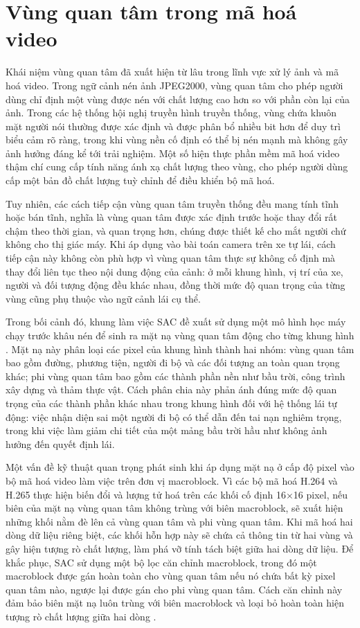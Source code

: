 \section{Vùng quan tâm trong mã hoá video}

Khái niệm vùng quan tâm đã xuất hiện từ lâu trong lĩnh vực xử lý ảnh và mã hoá video. Trong ngữ cảnh nén ảnh JPEG2000, vùng quan tâm cho phép người dùng chỉ định một vùng được nén với chất lượng cao hơn so với phần còn lại của ảnh. Trong các hệ thống hội nghị truyền hình truyền thống, vùng chứa khuôn mặt người nói thường được xác định và được phân bổ nhiều bit hơn để duy trì biểu cảm rõ ràng, trong khi vùng nền cố định có thể bị nén mạnh mà không gây ảnh hưởng đáng kể tới trải nghiệm. Một số hiện thực phần mềm mã hoá video thậm chí cung cấp tính năng ánh xạ chất lượng theo vùng, cho phép người dùng cấp một bản đồ chất lượng tuỳ chỉnh để điều khiển bộ mã hoá.

Tuy nhiên, các cách tiếp cận vùng quan tâm truyền thống đều mang tính tĩnh hoặc bán tĩnh, nghĩa là vùng quan tâm được xác định trước hoặc thay đổi rất chậm theo thời gian, và quan trọng hơn, chúng được thiết kế cho mắt người chứ không cho thị giác máy. Khi áp dụng vào bài toán camera trên xe tự lái, cách tiếp cận này không còn phù hợp vì vùng quan tâm thực sự không cố định mà thay đổi liên tục theo nội dung động của cảnh: ở mỗi khung hình, vị trí của xe, người và đối tượng động đều khác nhau, đồng thời mức độ quan trọng của từng vùng cũng phụ thuộc vào ngữ cảnh lái cụ thể.

Trong bối cảnh đó, khung làm việc SAC đề xuất sử dụng một mô hình học máy chạy trước khâu nén để sinh ra mặt nạ vùng quan tâm động cho từng khung hình \cite{SAC}. Mặt nạ này phân loại các pixel của khung hình thành hai nhóm: vùng quan tâm bao gồm đường, phương tiện, người đi bộ và các đối tượng an toàn quan trọng khác; phi vùng quan tâm bao gồm các thành phần nền như bầu trời, công trình xây dựng và thảm thực vật. Cách phân chia này phản ánh đúng mức độ quan trọng của các thành phần khác nhau trong khung hình đối với hệ thống lái tự động: việc nhận diện sai một người đi bộ có thể dẫn đến tai nạn nghiêm trọng, trong khi việc làm giảm chi tiết của một mảng bầu trời hầu như không ảnh hưởng đến quyết định lái.

Một vấn đề kỹ thuật quan trọng phát sinh khi áp dụng mặt nạ ở cấp độ pixel vào bộ mã hoá video làm việc trên đơn vị macroblock. Vì các bộ mã hoá H.264 và H.265 thực hiện biến đổi và lượng tử hoá trên các khối cố định 16$\times$16 pixel, nếu biên của mặt nạ vùng quan tâm không trùng với biên macroblock, sẽ xuất hiện những khối nằm đè lên cả vùng quan tâm và phi vùng quan tâm. Khi mã hoá hai dòng dữ liệu riêng biệt, các khối hỗn hợp này sẽ chứa cả thông tin từ hai vùng và gây hiện tượng rò chất lượng, làm phá vỡ tính tách biệt giữa hai dòng dữ liệu. Để khắc phục, SAC sử dụng một bộ lọc căn chỉnh macroblock, trong đó một macroblock được gán hoàn toàn cho vùng quan tâm nếu nó chứa bất kỳ pixel quan tâm nào, ngược lại được gán cho phi vùng quan tâm. Cách căn chỉnh này đảm bảo biên mặt nạ luôn trùng với biên macroblock và loại bỏ hoàn toàn hiện tượng rò chất lượng giữa hai dòng \cite{SAC}.

